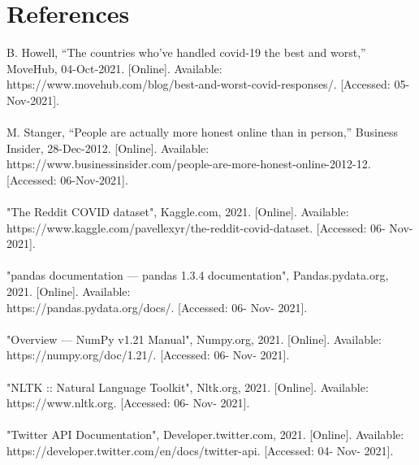 \documentclass[fontsize=11pt]{article}
\begin{document}
\section*{References}

\text{[1]} B. Howell, “The countries who've handled covid-19 the best and worst,” MoveHub, 04-Oct-2021. [Online]. Available: https://www.movehub.com/blog/best-and-worst-covid-responses/. [Accessed: 05-Nov-2021]. 
\\\\
\text{[2]} M. Stanger, “People are actually more honest online than in person,” Business Insider, 28-Dec-2012. [Online]. Available: https://www.businessinsider.com/people-are-more-honest-online-2012-12. [Accessed: 06-Nov-2021]. 
\\\\
\text{[3]} "The Reddit COVID dataset", Kaggle.com, 2021. [Online]. Available: https://www.kaggle.com/pavellexyr/the-reddit-covid-dataset. [Accessed: 06- Nov- 2021].
\\\\
\text{[4]} "pandas documentation — pandas 1.3.4 documentation", Pandas.pydata.org, 2021. [Online]. Available: \\ https://pandas.pydata.org/docs/. [Accessed: 06- Nov- 2021].
\\\\
\text{[5]} "Overview — NumPy v1.21 Manual", Numpy.org, 2021. [Online]. Available: https://numpy.org/doc/1.21/. [Accessed: 06- Nov- 2021].
\\\\
\text{[6]} "NLTK :: Natural Language Toolkit", Nltk.org, 2021. [Online]. Available: https://www.nltk.org. [Accessed: 06- Nov- 2021].
\\\\
\text{[7]} "Twitter API Documentation", Developer.twitter.com, 2021. [Online]. Available: \\ https://developer.twitter.com/en/docs/twitter-api. [Accessed: 04- Nov- 2021].

\end{document}
